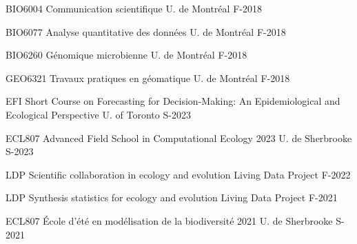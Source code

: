 \begin{cvhonors}
  \cvhonor
    {BIO6004} %
    {Communication scientifique} %
    {U. de Montréal} %
    {F-2018} %

  \cvhonor
    {BIO6077} %
    {Analyse quantitative des données} %
    {U. de Montréal} %
    {F-2018} %

  \cvhonor
    {BIO6260} %
    {Génomique microbienne} %
    {U. de Montréal} %
    {F-2018} %

  \cvhonor
    {GEO6321} %
    {Travaux pratiques en géomatique} %
    {U. de Montréal} %
    {F-2018} %

\end{cvhonors}



\begin{cvhonors}

  \cvhonor
    {EFI} %
    {Short Course on Forecasting for Decision-Making: An Epidemiological and Ecological Perspective} %
    {U. of Toronto} %
    {S-2023} %

  \cvhonor
    {ECL807} %
    {Advanced Field School in Computational Ecology 2023} %
    {U. de Sherbrooke} %
    {S-2023} %

  \cvhonor
    {LDP} %
    {Scientific collaboration in ecology and evolution} %
    {Living Data Project} %
    {F-2022} %

  \cvhonor
    {LDP} %
    {Synthesis statistics for ecology and evolution} %
    {Living Data Project} %
    {F-2021} %
    
  \cvhonor
    {ECL807} %
    {École d’été en modélisation de la biodiversité 2021} %
    {U. de Sherbrooke} %
    {S-2021} %

\end{cvhonors}

